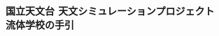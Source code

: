 
\setcounter{page}{1}

\newpage

\thispagestyle{empty}
\begin{center}
  \vspace*{1cm}
  { {\Large \bf 国立天文台 天文シミュレーションプロジェクト} \\
      \vspace{5mm}
  {\Huge \bf 流体学校の手引} }


  \vfill

  


\end{center}





